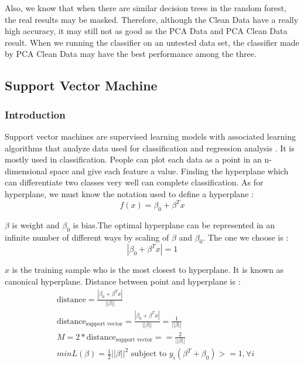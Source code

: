 \documentclass[sigconf]{acmart}
\begin{document}
Also, we know that when there are similar decision trees in the random forest, the real results may be masked. Therefore, although the Clean Data have a really high accuracy, it may still not as good as the PCA Data and PCA Clean Data result. When we running the classifier on an untested data set, the classifier made by PCA Clean Data may have the best performance among the three.

\subsection{Support Vector Machine}

\subsubsection{Introduction}

Support vector machines are supervised learning models with associated learning algorithms that analyze data used for classification and regression analysis \cite{wiki.svm}. It is mostly used in classification. People can plot each data as a point in an n-dimensional space and give each feature a value. Finding the hyperplane which can differentiate two classes very well can complete classification. As for hyperplane, we must know the notation used to define a hyperplane \cite{svm.form}:
\begin{equation*}
f(x) = \beta_0 + \beta^Tx
\end{equation*}

$\beta$ is weight and $\beta_0$ is bias.The optimal hyperplane can be represented in an infinite number of different ways by scaling of $\beta$ and $\beta_0$. The one we choose is \cite{svm.form}:
\begin{equation*}
    |\beta_0 + \beta^Tx| = 1
\end{equation*}

$x$ is the training sample who is the most closest to hyperplane. It is known as canonical hyperplane. Distance between point and hyperplane is \cite{svm.form}:
\begin{align*}
    & \text{distance}=\frac{|\beta_0 + \beta^Tx|}{||\beta||} \\
    & \text{distance}_{\text{support vector}}=\frac{|\beta_0+\beta^Tx|}{||\beta||}=\frac{1}{||\beta||} \\
    & M=2*\text{distance}_{\text{support vector}}==\frac{2}{||\beta||} \\
    & minL(\beta)=\frac{1}{2}||\beta||^2 \text{ subject to } y_i(\beta^T+ \beta_0)>=1, \forall{i}
\end{align*}
\end{document}
